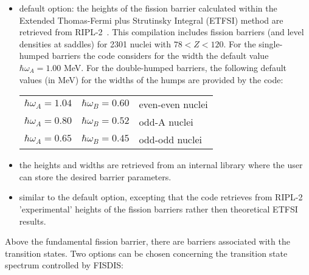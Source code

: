 \begin{itemize}
\item default option: the heights of the fission barrier calculated within
the Extended Thomas-Fermi plus Strutinsky Integral (ETFSI) method are
retrieved from RIPL-2~\cite{RIPL2}. This compilation includes fission
barriers (and level densities at saddles) for 2301 nuclei with $78<Z<120$.
For the single-humped barriers the code considers for the width the default
value $\hbar\omega_{A}=1.00$ MeV. For the double-humped barriers, the
following default values (in MeV) for the widths of the humps are provided
by the code: \newline
\begin{tabular}{lll}
$\hbar\omega_{A}=1.04$ & $\hbar\omega_{B}=0.60$ & even-even nuclei%
\tabularnewline $\hbar\omega_{A}=0.80$ & $\hbar\omega_{B}=0.52$ & odd-A
nuclei\tabularnewline $\hbar\omega_{A}=0.65$ & $\hbar\omega_{B}=0.45$ &
odd-odd nuclei \tabularnewline%
\end{tabular}%
\newline


\item the heights and widths are retrieved from an internal library
\noindent where the user can store the desired barrier parameters.

\item similar to the default option, excepting that the code retrieves from
RIPL-2 'experimental' heights of the fission barriers rather then
theoretical ETFSI results.
\end{itemize}

Above the fundamental fission barrier, there are barriers associated  with
the transition states. Two options can be chosen concerning the transition
state spectrum controlled by FISDIS:

